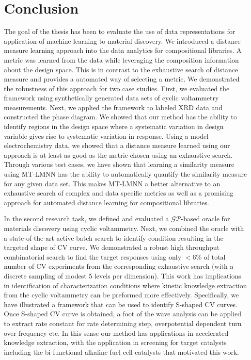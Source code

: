 \chapter{Conclusion}\label{Chapter 5}
The goal of the thesis has been to evaluate the use of data representations for application of machine learning to material discovery.
We introduced a distance measure learning approach into the data analytics for compositional libraries. 
A metric was learned from the data while leveraging the composition information about the design space. 
This is in contrast to the exhaustive search of distance measure and provides a automated way of selecting a metric.
We demonstrated the robustness of this approach for two case studies. 
First, we evaluated the framework using synthetically generated data sets of cyclic voltammetry measurements. 
Next, we applied the framework to labeled XRD data and constructed the phase diagram.
We showed that our method has the ability to identify regions in the design space where a systematic variation in design variable gives rise to systematic variation in response. 
Using a model electrochemistry data, we showed that a distance measure learned using our approach is at least as good as the metric chosen using an exhaustive search.
Through various test cases, we have shown that learning a similarity measure using MT-LMNN has the ability to automatically quantify the similarity measure for any given data set. This makes MT-LMNN a better alternative to an exhaustive search of complex and data specific metrics as well as a promising approach for automated distance learning for compositional libraries. 


In the second research task, we defined and evaluated a \(\mathcal{GP}\)-based oracle for materials discovery using cyclic voltammetry.
Next, we combined the oracle with a state-of-the-art active batch search to identify condition resulting in the targeted shape of CV curve. 
We demonstrated a robust high throughput combinatorial search to find the target responses using only \(<6\%\) of total number of CV experiments from the corresponding exhaustive search (with a discrete sampling of modest 5 levels per dimension). 
This work has implications in identification of characterization conditions where kinetic knowledge extraction from the cyclic voltammetry can be preformed more effectively. 
Specifically, we have illustrated a framework that can be used to identify S-shaped CV curves. 
Once S-shaped CV curve is obtained, a foot of the wave analysis can be applied ~\cite{FOWA} to extract rate constant for rate determining step, overpotential dependent turn over frequency etc.
In this sense our method has applications in accelerated knowledge extraction, with the application in screening for target catalysts including the bi-functional alkaline fuel cell catalysts that motivated this work.


